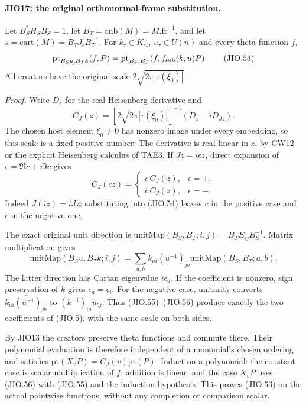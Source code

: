 \paragraph{JIO17: the original orthonormal-frame substitution.}
\label{claim:JIO17}
Let \(B_S^*H_SB_S=1\), let
\(B_T=\mathrm{onb}(M)=M.\mathrm{fr}^{-1}\), and let
\(s=\mathrm{cart}(M)=B_TJ_\epsilon B_T^{-1}\).
For \(k_\tau\in K_{\epsilon_\tau}\), \(u_\tau\in U(n)\)
and every theta function \(f\),
\[
 \mathrm{pt}_{B_Su,B_Tk}(f,P)
              =\mathrm{pt}_{B_S,B_T}(f,f_{\rm sub}(k,u)P).
 \tag{JIO.53}
\]
All creators have the original scale
\(2\sqrt{2\pi|\tau(\xi_0)|}\).

\emph{Proof.}
Write \(D_z\) for the real Heisenberg derivative and
\[
       C_J(z)=
        [2\sqrt{2\pi|\tau(\xi_0)|}]^{-1}(D_z-iD_{Jz}).
 \tag{JIO.54}
\]
The chosen host element \(\xi_0\ne0\) has nonzero image under
every embedding, so this scale is a fixed positive number.
The derivative is real-linear in \(z\), by CW12 or the explicit
Heisenberg calculus of TAE3.
If \(Jz=i\epsilon z\), direct expansion of
\(c=\Re c+i\Im c\) gives
\[
             C_J(cz)=
                  \begin{cases}c\,C_J(z),&\epsilon=+,\\
                                \overline c\,C_J(z),&\epsilon=-.
                   \end{cases}
 \tag{JIO.55}
\]
Indeed \(J(iz)=iJz\); substituting into (JIO.54) leaves \(c\)
in the positive case and \(\overline c\) in the negative one.

The exact original unit direction is
\(\mathrm{unitMap}(B_S,B_T;i,j)=B_TE_{ij}B_S^{-1}\).
Matrix multiplication gives
\[
 \mathrm{unitMap}(B_Su,B_Tk;i,j)
       =\sum_{a,b} k_{ai}(u^{-1})_{jb}
                      \mathrm{unitMap}(B_S,B_T;a,b).
 \tag{JIO.56}
\]
The latter direction has Cartan eigenvalue \(i\epsilon_a\).
If the coefficient is nonzero, sign preservation of \(k\)
gives \(\epsilon_a=\epsilon_i\).
For the negative case, unitarity converts
\(\overline{k_{ai}(u^{-1})_{jb}}\) to
\((k^{-1})_{ia}u_{bj}\).
Thus (JIO.55)--(JIO.56) produce exactly the two coefficients
of (JIO.5), with the same scale on both sides.

By JIO13 the creators preserve theta functions and commute
there.  Their polynomial evaluation is therefore independent
of a monomial's chosen ordering and satisfies
\(\mathrm{pt}(X_vP)=C_J(v)\mathrm{pt}(P)\).
Induct on a polynomial: the constant case is scalar
multiplication of \(f\), addition is linear, and the case
\(X_vP\) uses (JIO.56) with (JIO.55) and the induction
hypothesis.  This proves (JIO.53) on the actual pointwise
functions, without any completion or comparison scalar.

